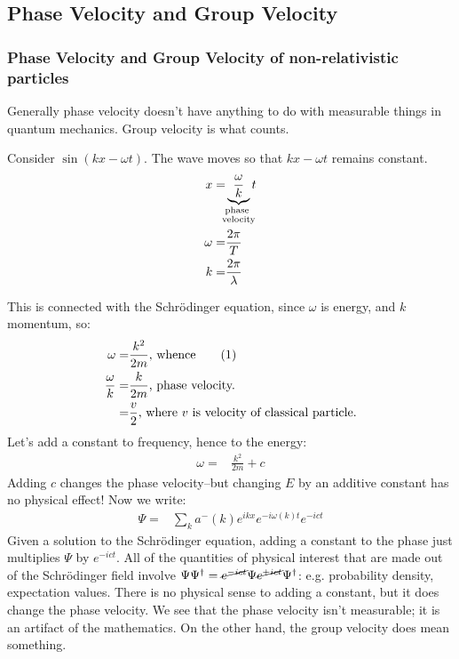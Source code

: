 \documentclass[]{article}
\newcommand\numberthis{\addtocounter{equation}{1}\tag{\theequation}}
\newcommand{\Schr}{{Schr\"odinger }}
\begin{document}
\subsection{Phase Velocity and Group Velocity}\label{section:phase:group:velocities}

\subsubsection{Phase Velocity and Group Velocity of non-relativistic particles}
Generally phase velocity doesn't have anything to do with measurable things in quantum mechanics. Group velocity is what counts.

Consider $\sin(kx-\omega t)$. The wave moves so that $kx-\omega t$ remains constant.
\begin{align*}
	x =& \underbrace{\frac{\omega}{k}}_{\mathclap{\substack{\text{phase }\\
															\text{velocity}}}} t\\
	\omega =& \frac{2 \pi}{T}\\
	k =& \frac{2 \pi}{\lambda}
\end{align*}

This is connected with the \Schr equation, since $\omega$ is energy, and $k$ momentum, so:
\begin{align*}
	\omega=&\frac{k^2}{2m} \text{, whence} \numberthis \label{fig:phase:c}\\
	\frac{\omega}{k}=&\frac{k}{2m} \text{, phase velocity.}\\
	=& \frac{v}{2}  \text{, where $v$ is velocity of classical particle.}
\end{align*}
 Let's add a constant to frequency, hence to the energy:
\begin{align*}
	\omega=&\frac{k^2}{2m}+c 
\end{align*}
Adding $c$ changes the phase velocity--but changing $E$ by an additive constant has no physical effect! Now we write:
\begin{align*}
	\Psi =& \sum_k a^-(k) e^{ikx}e^{- i \omega(k) t} e^{-i c t}
\end{align*}
Given a solution to the \Schr equation, adding a constant to the phase just multiplies $\Psi$ by $e^{-i c t}$. All of the quantities of physical interest that are made out of the \Schr field involve $\Psi\Psi^\dagger=\cancel{e^{-i c t}}\Psi \cancel{e^{+i c t}}\Psi^\dagger$: e.g. probability density, expectation values. There is no physical sense to adding a constant, but it does change the phase velocity. We see that the phase velocity isn't measurable; it is an artifact of the mathematics. On the other hand, the group velocity does mean something.
\end{document}
